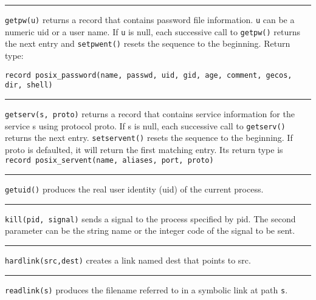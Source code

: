 \bigskip\hrule\vspace{0.1cm}

\noindent
\texttt{getpw(u)} returns a record that contains password file
information. \texttt{u} can
be a numeric uid or a user name. If \texttt{u} is null, each successive call to
\texttt{getpw()} returns the next entry and \texttt{setpwent()} resets
the sequence to the beginning. Return type:

\noindent
\texttt{record posix\_password(name, passwd, uid, gid, age, comment, gecos,
dir, shell)}

\bigskip\hrule\vspace{0.1cm}

\noindent
\texttt{getserv(s, proto)} returns a record that contains service information
for the service s using protocol proto. If s is null, each successive call
to \texttt{getserv()} returns the next entry. \texttt{setservent()}
resets the sequence to the beginning.
If proto is defaulted, it will return the first matching entry. Its
return type is \texttt{record posix\_servent(name, aliases, port, proto)}


\bigskip\hrule\vspace{0.1cm}

\noindent
\texttt{getuid()} produces the real user identity (uid) of the current process. 

\bigskip\hrule\vspace{0.1cm}

\noindent
\texttt{kill(pid, signal)} sends a signal to the process specified by pid. The
second parameter can be the string name or the integer code of the
signal to be sent.

\bigskip\hrule\vspace{0.1cm}

\noindent
{}\texttt{hardlink(src,dest)} creates a link
named dest that points to src.

\bigskip\hrule\vspace{0.1cm}

\noindent
\texttt{readlink(s)} produces the filename referred to in a symbolic link
at path \texttt{s}.

